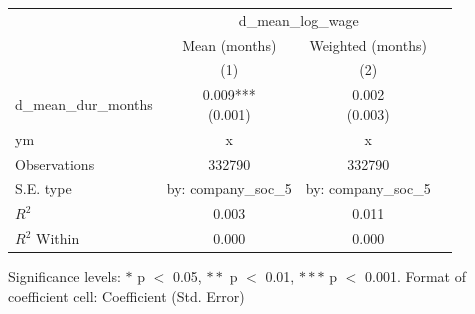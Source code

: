 \renewcommand\cellalign{t}
\begin{threeparttable}
\begin{tabular}{lccc}
\toprule
 & \multicolumn{2}{c}{d_mean_log_wage} \\
\cmidrule(lr){2-3} 
 & Mean (months) & Weighted (months) \\
 & (1) & (2) \\
\midrule
\addlinespace
d_mean_dur_months & \makecell{0.009*** \\ (0.001)} & \makecell{0.002 \\ (0.003)} \\
\midrule
\addlinespace
ym & x & x \\
\midrule
\addlinespace
Observations & 332790 & 332790 \\
S.E. type & by: company_soc_5 & by: company_soc_5 \\
$R^2$ & 0.003 & 0.011 \\
$R^2$ Within & 0.000 & 0.000 \\
\bottomrule
\end{tabular}
\footnotesize Significance levels: $*$ p $<$ 0.05, $**$ p $<$ 0.01, $***$ p $<$ 0.001. Format of coefficient cell: Coefficient 
 (Std. Error)
\end{threeparttable}